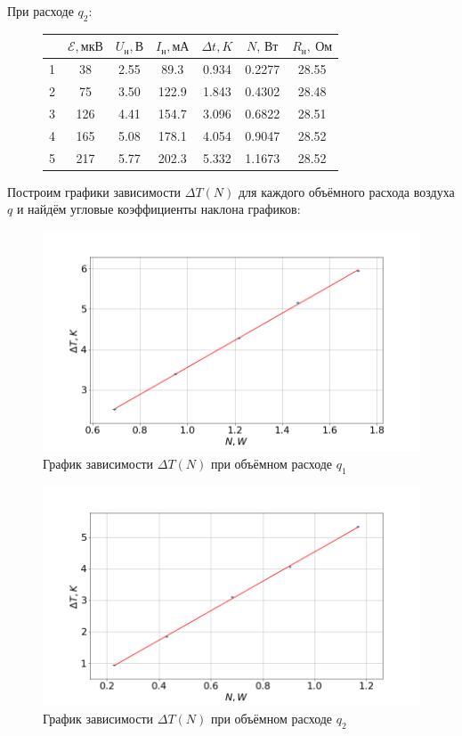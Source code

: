 \documentclass[a4paper, fontsize=14pt]{article}
\begin{document}
При расходе $q_2$:
\begin{figure}[H]
\center
\begin{tabular}{|c|c|c|c|c|c|c|}\hline
{} &   $\mathcal{E}, \text{мкВ}$ & $U_\text{н}, \text{В}$ & $I_\text{н}, \text{мА}$ & $\Delta t, K$ & $N,\, \text{Вт}$ & $R_\text{н},\ \text{Ом}$ \\\hline
1 &   38 &  2.55 &   89.3 &  0.934 &  0.2277 &  28.55 \\\hline
2 &   75 &  3.50 &  122.9 &  1.843 &  0.4302 &  28.48 \\\hline
3 &  126 &  4.41 &  154.7 &  3.096 &  0.6822 &  28.51 \\\hline
4 &  165 &  5.08 &  178.1 &  4.054 &  0.9047 &  28.52 \\\hline
5 &  217 &  5.77 &  202.3 &  5.332 &  1.1673 &  28.52 \\\hline
\end{tabular}


\end{figure}
Построим графики зависимости $\Delta T(N)$ для каждого объёмного расхода воздуха $q$ и найдём угловые коэффициенты наклона графиков:

\begin{figure}[H]
\center
\includegraphics[scale=0.4]{q1.png}
\caption{График зависимости $\Delta T(N)$ при объёмном расходе $q_1$}
\end{figure}

\begin{figure}[H]
\center
\includegraphics[scale=0.4]{q2.png}
\caption{График зависимости $\Delta T(N)$ при объёмном расходе $q_2$}
\end{figure}
\end{document}
